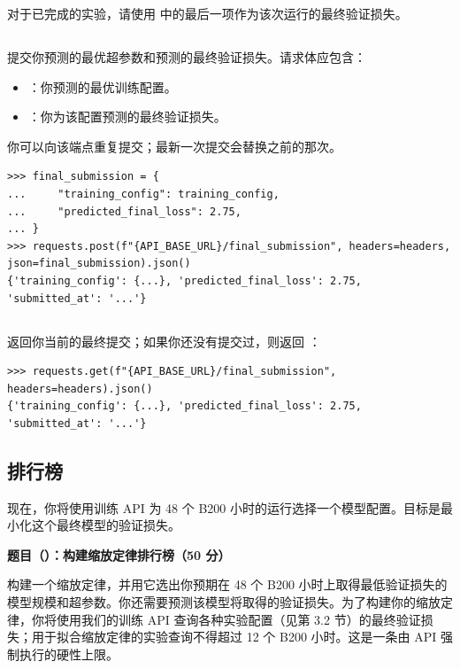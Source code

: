 对于已完成的实验，请使用  中的最后一项作为该次运行的最终验证损失。

\subsection*{}

提交你预测的最优超参数和预测的最终验证损失。请求体应包含：

\begin{itemize}
  \item {}：你预测的最优训练配置。
  \item {}：你为该配置预测的最终验证损失。
\end{itemize}

你可以向该端点重复提交；最新一次提交会替换之前的那次。

\begin{lstlisting}
>>> final_submission = {
...     "training_config": training_config,
...     "predicted_final_loss": 2.75,
... }
>>> requests.post(f"{API_BASE_URL}/final_submission", headers=headers,
json=final_submission).json()
{'training_config': {...}, 'predicted_final_loss': 2.75, 'submitted_at': '...'}
\end{lstlisting}

\subsection*{}

返回你当前的最终提交；如果你还没有提交过，则返回 ：

\begin{lstlisting}
>>> requests.get(f"{API_BASE_URL}/final_submission", headers=headers).json()
{'training_config': {...}, 'predicted_final_loss': 2.75, 'submitted_at': '...'}
\end{lstlisting}

\subsection{排行榜}

现在，你将使用训练 API 为 48 个 B200 小时的运行选择一个模型配置。目标是最小化这个最终模型的验证损失。

\noindent\textbf{题目（）：构建缩放定律排行榜（50 分）}

构建一个缩放定律，并用它选出你预期在 48 个 B200 小时上取得最低验证损失的模型规模和超参数。你还需要预测该模型将取得的验证损失。为了构建你的缩放定律，你将使用我们的训练 API 查询各种实验配置（见第 3.2 节）的最终验证损失；用于拟合缩放定律的实验查询不得超过 12 个 B200 小时。这是一条由 API 强制执行的硬性上限。

